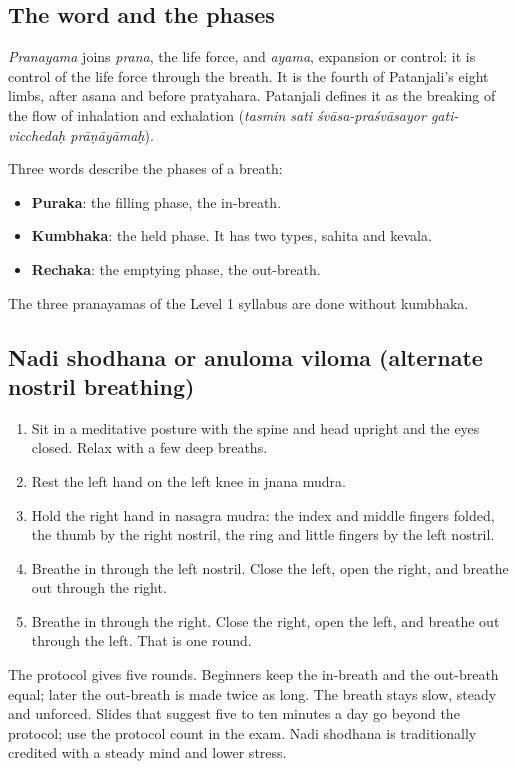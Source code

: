 \subsection*{The word and the phases}
\emph{Pranayama} joins \emph{prana}, the life force, and \emph{ayama}, expansion or control: it is control of the life force through the breath. It is the fourth of Patanjali's eight limbs, after asana and before pratyahara. Patanjali defines it as the breaking of the flow of inhalation and exhalation (\emph{tasmin sati śvāsa-praśvāsayor gati-vicchedaḥ prāṇāyāmaḥ}).

Three words describe the phases of a breath:
\begin{itemize}
\item \textbf{Puraka}: the filling phase, the in-breath.
\item \textbf{Kumbhaka}: the held phase. It has two types, sahita and kevala.
\item \textbf{Rechaka}: the emptying phase, the out-breath.
\end{itemize}
The three pranayamas of the Level 1 syllabus are done without kumbhaka.

\subsection*{Nadi shodhana or anuloma viloma (alternate nostril breathing)}
\begin{enumerate}
\item Sit in a meditative posture with the spine and head upright and the eyes closed. Relax with a few deep breaths.
\item Rest the left hand on the left knee in jnana mudra.
\item Hold the right hand in nasagra mudra: the index and middle fingers folded, the thumb by the right nostril, the ring and little fingers by the left nostril.
\item Breathe in through the left nostril. Close the left, open the right, and breathe out through the right.
\item Breathe in through the right. Close the right, open the left, and breathe out through the left. That is one round.
\end{enumerate}
The protocol gives five rounds. Beginners keep the in-breath and the out-breath equal; later the out-breath is made twice as long. The breath stays slow, steady and unforced. Slides that suggest five to ten minutes a day go beyond the protocol; use the protocol count in the exam. Nadi shodhana is traditionally credited with a steady mind and lower stress.

